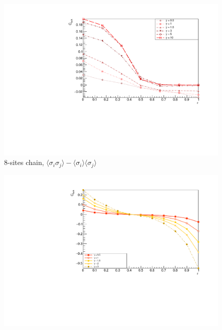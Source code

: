 \begin{figure}[H]
    \centering
    \includegraphics[scale=0.7]{Figures/8sites_CBulkConnVSgamma.pdf}
    \caption{8-sites chain, $\langle\sigma_i\sigma_j \rangle - \langle\sigma_i \rangle\langle\sigma_j \rangle$}
    \label{fig:my_label}
\end{figure}

\begin{figure}[H]
    \centering
    \includegraphics[scale=0.7]{Figures/12sites/12sites_CFBulkVSgamma.pdf}
    \caption{}
    \label{fig:my_label}
\end{figure}

